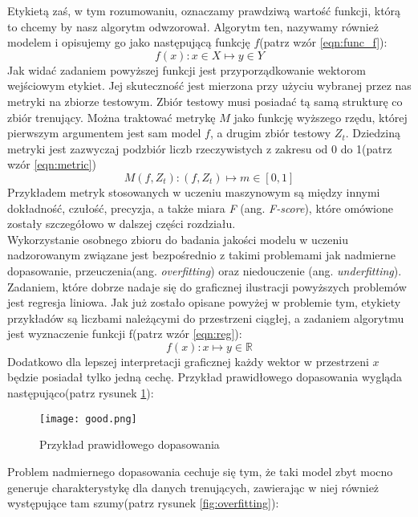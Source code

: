 Etykietą zaś, w tym rozumowaniu, oznaczamy prawdziwą wartość funkcji, którą to chcemy by nasz algorytm odwzorował. Algorytm ten, nazywamy również modelem i opisujemy go jako następującą funkcję $f$(patrz wzór \ref{eqn:func_f}):
\begin{equation}
	f(x): x \in X \mapsto y \in Y
	\label{eqn:func_f}
\end{equation}
Jak widać zadaniem powyższej funkcji jest przyporządkowanie wektorom wejściowym etykiet. Jej skuteczność jest mierzona przy użyciu wybranej przez nas metryki na zbiorze testowym. Zbiór testowy musi posiadać tą samą strukturę co zbiór trenujący. Można traktować metrykę $M$ jako funkcję wyższego rzędu, której pierwszym argumentem jest sam model $f$, a drugim zbiór testowy $Z_{t}$. Dziedziną metryki jest zazwyczaj podzbiór liczb rzeczywistych z zakresu od 0 do 1(patrz wzór \ref{eqn:metric})
\begin{equation}
	M(f, Z_{t}): (f, Z_{t}) \mapsto m \in [0, 1]
	\label{eqn:metric}
\end{equation}
Przykładem metryk stosowanych w uczeniu maszynowym są między innymi dokładność, czułość, precyzja, a także miara \textit{F} (ang. \textit{F-score}), które
omówione zostały szczegółowo w dalszej części rozdziału.
\\

Wykorzystanie osobnego zbioru do badania jakości modelu w uczeniu nadzorowanym związane jest bezpośrednio z takimi problemami jak nadmierne dopasowanie, przeuczenia(ang. \textit{overfitting}) oraz niedouczenie (ang. \textit{underfitting})\cite{hands_on}. Zadaniem, które dobrze nadaje się do graficznej ilustracji powyższych problemów jest regresja liniowa. Jak już zostało opisane powyżej w problemie tym, etykiety
przykładów są liczbami należącymi do przestrzeni ciągłej, a zadaniem algorytmu jest wyznaczenie funkcji f(patrz wzór \ref{eqn:reg}):
\begin{equation}
	f(x): x \mapsto y \in \mathbb{R}
	\label{eqn:reg}
\end{equation}
Dodatkowo dla lepszej interpretacji graficznej każdy wektor w przestrzeni $x$ będzie posiadał tylko jedną cechę. Przykład prawidłowego dopasowania wygląda następująco(patrz rysunek \ref{fig:probki}):

\begin{figure}[h!]
	\texttt{[image: good.png]}
	\centering
	\caption{Przykład prawidłowego dopasowania}
	\label{fig:probki}
\end{figure}

Problem nadmiernego dopasowania cechuje się tym, że taki model zbyt mocno generuje charakterystykę dla danych trenujących, zawierając w niej również występujące tam szumy(patrz rysunek \ref{fig:overfitting}):

